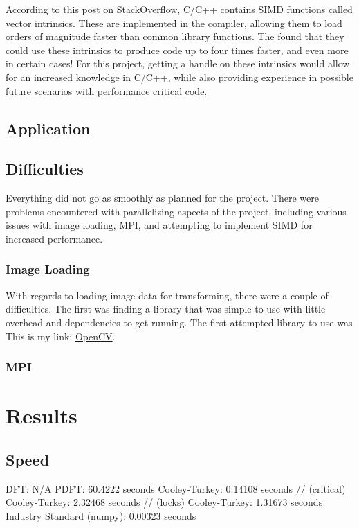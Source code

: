 \documentclass[12pt]{extarticle}
\begin{document}
    According to this post\cite{Konstantin:2020} on StackOverflow, C/C++ contains SIMD functions called vector intrinsics.
    These are implemented in the compiler, allowing them to load orders of magnitude faster than common library functions. 
    The found that they could use these intrinsics to produce code up to four times faster, and even more in certain cases!
    For this project, getting a handle on these intrinsics would allow for an increased knowledge in C/C++, while also providing
    experience in possible future scenarios with performance critical code.

\subsection*{Application}

\subsection*{Difficulties}
	Everything did not go as smoothly as planned for the project. There were problems encountered with parallelizing aspects of the 
	project, including various issues with image loading, MPI, and attempting to implement SIMD for increased performance.

	\subsubsection*{Image Loading}
	With regards to loading image data for transforming, there were a couple of difficulties. The first was finding a library that was 
	simple to use with little overhead and dependencies to get running. The first attempted library to use was This is my link: \href{https://opencv.org/}{OpenCV}.

	\subsubsection*{MPI}

\section*{Results}
\subsection*{Speed}
DFT: 				N/A
PDFT: 				60.4222 seconds
Cooley-Turkey: 		0.14108 seconds
// (critical) Cooley-Turkey: 	2.32468 seconds
// (locks) Cooley-Turkey: 	1.31673 seconds
Industry Standard (numpy):	0.00323 seconds
\end{document}
